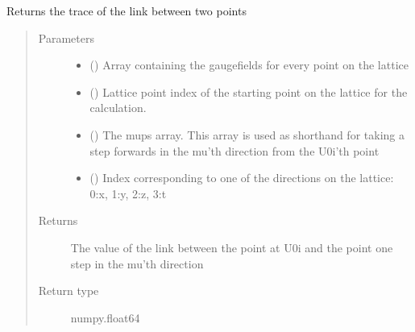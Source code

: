 \documentclass[letterpaper,10pt,english]{sphinxmanual}
\begin{document}
\begin{fulllineitems}
\label{\detokenize{index:su2.link}}
Returns the trace of the link between two points
\begin{quote}\begin{description}
\item[{Parameters}] \leavevmode\begin{itemize}
\item {} 
 () \textendash{} Array containing the gaugefields for every point on the lattice

\item {} 
 () \textendash{} Lattice point index of the starting point on the lattice for
the calculation.

\item {} 
 () \textendash{} The mups array. This array is used as shorthand for taking a
step forwards in the mu’th direction from the U0i’th point

\item {} 
 () \textendash{} Index corresponding to one of the directions on the lattice:
0:x, 1:y, 2:z, 3:t

\end{itemize}

\item[{Returns}] \leavevmode
The value of the link between the point at U0i and the point
one step in the mu’th direction

\item[{Return type}] \leavevmode
numpy.float64

\end{description}\end{quote}

\end{fulllineitems}

\end{document}
